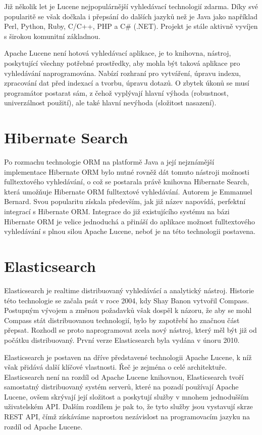 \documentclass[11pt,draft,oneside]{fithesis2}
\begin{document}
Již několik let je Lucene nejpopulárnější vyhledávací technologií zdarma. Díky své popularitě se však dočkala i přepsání do dalších jazyků než je Java jako například Perl, Python, Ruby, C/C++, PHP a C\# (.NET). Projekt je stále aktivně vyvíjen s širokou komunitní základnou.

Apache Lucene není hotová vyhledávací aplikace, je to knihovna, nástroj, poskytující všechny potřebné prostředky, aby mohla být taková aplikace pro vyhledávání naprogramována. Nabízí rozhraní pro vytváření, úpravu indexu, zpracování dat před indexací a tvorbu, úpravu dotazů. O zbytek úkonů se musí programátor postarat sám, z čehož vyplývají hlavní výhoda (robustnost, univerzálnost použití), ale také hlavní nevýhoda (složitost nasazení).

\section{Hibernate Search}
Po rozmachu technologie ORM na platformě Java a její nejznámější implementace Hibernate ORM bylo nutné rovněž dát tomuto nástroji možnosti fulltextového vyhledávání, o což se postarala právě knihovna Hibernate Search, která umožňuje Hibernate ORM fulltextové vyhledávání. Autorem je Emmanuel Bernard. 
Svou popularitu získala především, jak již název napovídá, perfektní integrací s Hibernate ORM. Integrace do již existujícího systému na bázi Hibernate ORM je velice jednoduchá a přináší do aplikace možnost fulltextového vyhledávání s plnou silou Apache Lucene, neboť je na této technologii postavena.

\section{Elasticsearch}
Elasticsearch je realtime distribuovaný vyhledávácí a analytický nástroj. Historie této technologie se začala psát v roce 2004, kdy Shay Banon vytvořil Compass. Postupným vývojem a změnou požadavků však dospěl k názoru, že aby se mohl Compass stát distribuovanou technologií, bylo by zapotřebí ho značnou část přepsat.
Rozhodl se proto naprogramovat zcela nový nástroj, který měl být již od počátku distribuovaný. První verze Elasticsearch byla vydána v únoru 2010.

Elasticsearch je postaven na dříve představené technologii Apache Lucene, k níž však přidává další klíčové vlastnosti. Řeč je zejména o celé architektuře. Elasticsearch není na rozdíl od Apache Lucene knihovnou, Elasticsearch tvoří samostatný distribuovaný systém serverů, které na pozadí používají Apache Lucene, ovšem 
skrývají její složitost a poskytují služby v mnohem jednodušším uživatelském API. Dalším rozdílem je pak to, že tyto služby jsou vystavují skrze REST API, čímž získáváme naprostou nezávislost na programovacím jazyku na rozdíl od Apache Lucene. 
\end{document}
